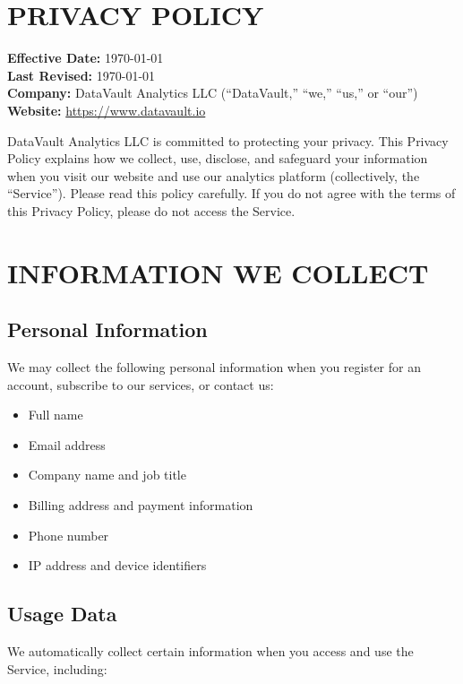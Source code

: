 \documentclass[
    language=english,
    doctype=privacy-policy,
    institution=none,
]{../../omnilatex}
\begin{document}
\maketitle

\section*{PRIVACY POLICY}

\textbf{Effective Date:} \today\\
\textbf{Last Revised:} \today\\
\textbf{Company:} DataVault Analytics LLC (``DataVault,'' ``we,'' ``us,'' or ``our'')
\textbf{Website:} \url{https://www.datavault.io}

DataVault Analytics LLC is committed to protecting your privacy. This Privacy Policy explains how we collect, use, disclose, and safeguard your information when you visit our website and use our analytics platform (collectively, the ``Service''). Please read this policy carefully. If you do not agree with the terms of this Privacy Policy, please do not access the Service.

\section{INFORMATION WE COLLECT}

\subsection{Personal Information}
We may collect the following personal information when you register for an account, subscribe to our services, or contact us:

\begin{itemize}
    \item Full name
    \item Email address
    \item Company name and job title
    \item Billing address and payment information
    \item Phone number
    \item IP address and device identifiers
\end{itemize}

\subsection{Usage Data}
We automatically collect certain information when you access and use the Service, including:
\end{document}
